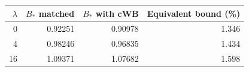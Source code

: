 \begin{tabular}{rrrr}
\toprule
$\lambda$ & $B_*$ matched & $B_*$ with cWB & Equivalent bound (\%) \\
\midrule
0 & 0.92251 & 0.90978 & 1.346 \\
4 & 0.98246 & 0.96835 & 1.434 \\
16 & 1.09371 & 1.07682 & 1.598 \\
\bottomrule
\end{tabular}
